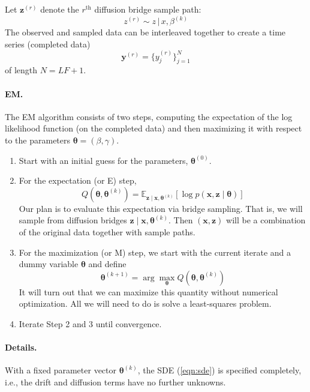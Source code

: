 \documentclass{article}
\newcommand{\btheta}{\ensuremath{\bm{\theta}}}
\newcommand{\bx}{\ensuremath{\mathbf{x}}}
\newcommand{\bz}{\ensuremath{\mathbf{z}}}
\begin{document}
Let $\mathbf{z}^{(r)}$ denote the $r^\text{th}$ diffusion bridge sample path:
\begin{equation}
z^{(r)} \sim z \, | \, x, \beta^{(k)}
\end{equation}
The observed and sampled data can be interleaved together to create a time series (completed data)
$$
\mathbf{y}^{(r)} = \{y_j^{(r)}\}_{j=1}^N
$$
of length $N = LF + 1$.  


\paragraph{EM.} The EM algorithm consists of two steps, computing the expectation of the log likelihood function (on the completed data) and then maximizing it with respect to the parameters $\btheta = (\beta, \gamma)$.
\begin{enumerate}
\item Start with an initial guess for the parameters, $\btheta^{(0)}$.
\item For the expectation (or E) step,
\begin{equation}
\label{eqn:expectation}
Q(\btheta, \btheta^{(k)}) = \mathbb{E}_{\bz \mid \bx, \btheta^{(k)}} [\log p(\bx, \bz \mid \btheta)]
\end{equation}
Our plan is to evaluate this expectation via bridge sampling.  That is, we will sample from diffusion bridges $\bz \mid \bx, \btheta^{(k)}$.  Then $(\bx, \bz)$ will be a combination of the original data together with sample paths.
\item For the maximization (or M) step, we start with the current iterate and a dummy variable $\btheta$ and define
\begin{equation}
\label{eqn:maximization}
\btheta^{(k+1)} = \arg \max_{\btheta} Q(\btheta, \btheta^{(k)})
\end{equation}
It will turn out that we can maximize this quantity without numerical optimization.  All we will need to do is solve a least-squares problem.
\item Iterate Step 2 and 3 until convergence.
\end{enumerate}

\paragraph{Details.} With a fixed parameter vector $\btheta^{(k)}$, the SDE (\ref{eqn:sde}) is specified completely, i.e., the drift and diffusion terms have no further unknowns.  
\end{document}
